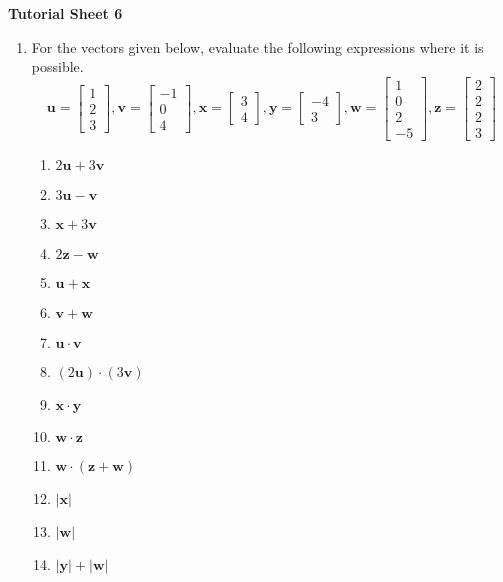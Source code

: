 \documentclass[11pt,a4paper,titlepage,oneside,openany]{article}
\numberwithin{equation}{section}
\numberwithin{algorithm}{section}
\numberwithin{figure}{section}
\numberwithin{table}{section}
\renewcommand{\vec}[1]{\mathbf{#1}}
\begin{document}
\begin{center}
  \textbf{Tutorial Sheet 6}
\end{center}

\begin{enumerate}
\item For the vectors given below, evaluate the following expressions where it is possible.
  \begin{equation*}
    \vec{u}=\left[ \begin{array}{c} 1 \\ 2 \\ 3 \end{array}\right],
    \vec{v}=\left[ \begin{array}{c} -1 \\ 0 \\ 4 \end{array}\right],
    \vec{x}=\left[ \begin{array}{c} 3 \\ 4 \end{array}\right],
    \vec{y}=\left[ \begin{array}{c} -4 \\ 3 \end{array}\right],
    \vec{w}=\left[ \begin{array}{c} 1 \\ 0\\ 2 \\ -5 \end{array}\right],
    \vec{z}=\left[ \begin{array}{c} 2 \\ 2 \\ 2 \\ 3 \end{array}\right]
        \end{equation*}
        \begin{multicols}{3}
          \begin{enumerate}
          \item $2\vec{u} + 3\vec{v}$
          \item $3\vec{u} - \vec{v}$
          \item $\vec{x} + 3\vec{v}$
          \item $2\vec{z} - \vec{w}$
          \item $\vec{u}+\vec{x}$
          \item $\vec{v}+\vec{w}$
          \item $\vec{u}\cdot \vec{v}$
          \item $\left(2\vec{u}\right)\cdot \left(3\vec{v}\right)$
          \item $\vec{x}\cdot \vec{y}$
          \item $\vec{w} \cdot \vec{z}$
          \item $\vec{w} \cdot (\vec{z}+\vec{w})$
          \item $|\vec{x}|$
          \item $|\vec{w}|$
          \item $|\vec{y}|+|\vec{w}|$
          \end{enumerate}
        \end{multicols}


\end{enumerate}
\end{document}
